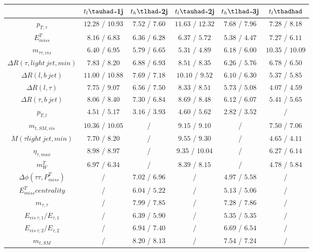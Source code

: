\centering
\begin{tabular}{cccccc} \toprule\toprule
 & $t_{l}\tauhad$-1j & $t_{h}\tlhad$-2j & $t_{l}\tauhad$-2j & $t_{h}\tlhad$-3j & $t_l\thadhad$\\\midrule
$p_{T,\tau }$ & $12.28$ / $10.93$ & $7.52$ / $7.60$ & $11.63$ / $12.32$ & $7.68$ / $7.96$ & $7.28$ / $8.18$\\
$E^{T}_{miss}$ & $8.16$ / $6.83$ & $6.36$ / $6.28$ & $6.37$ / $5.72$ & $5.38$ / $4.47$ & $7.27$ / $6.11$\\
$m_{\tau \tau ,vis}$ & $6.40$ / $6.95$ & $5.79$ / $6.65$ & $5.31$ / $4.89$ & $6.18$ / $6.00$ & $10.35$ / $10.09$\\
$\Delta R(\tau ,light~jet,min)$ & $7.83$ / $8.20$ & $6.88$ / $6.93$ & $8.51$ / $8.35$ & $6.26$ / $5.76$ & $6.78$ / $6.50$\\
$\Delta R(l,b~jet)$ & $11.00$ / $10.88$ & $7.69$ / $7.18$ & $10.10$ / $9.52$ & $6.10$ / $6.30$ & $5.37$ / $5.85$\\
$\Delta R(l,\tau )$ & $7.75$ / $9.07$ & $6.56$ / $7.50$ & $8.33$ / $8.51$ & $5.73$ / $5.08$ & $4.07$ / $4.59$\\
$\Delta R(\tau ,b~jet)$ & $8.06$ / $8.40$ & $7.30$ / $6.84$ & $8.69$ / $8.48$ & $6.12$ / $6.07$ & $5.41$ / $5.65$\\
$p_{T,l}$ & $4.51$ / $5.17$ & $3.16$ / $3.93$ & $4.60$ / $5.62$ & $2.82$ / $3.52$ &  /\\
$m_{t,SM,vis}$ & $10.36$ / $10.05$ &  / & $9.15$ / $9.10$ &  / & $7.50$ / $7.06$\\
$M(\tau  light~jet,min)$ & $7.70$ / $8.20$ &  / & $9.55$ / $9.30$ &  / & $4.65$ / $4.11$\\
$\eta_{\tau ,max}$ & $8.98$ / $8.97$ &  / & $9.35$ / $10.04$ &  / & $6.27$ / $6.14$\\
$m^{T}_{W}$ & $6.97$ / $6.34$ &  / & $8.39$ / $8.15$ &  / & $4.78$ / $5.84$\\
$\Delta\phi(\tau \tau ,P^{T}_{miss})$ &  / & $7.02$ / $6.96$ &  / & $4.97$ / $5.58$ &  /\\
$E^{T}_{miss} centrality$ &  / & $6.04$ / $5.22$ &  / & $5.13$ / $5.06$ &  /\\
$m_{\tau ,\tau }$ &  / & $7.99$ / $7.85$ &  / & $7.28$ / $7.86$ &  /\\
$E_{vis~\tau ,1}/E_{\tau ,1}$ &  / & $6.39$ / $5.90$ &  / & $5.35$ / $5.35$ &  /\\
$E_{vis~\tau ,2}/E_{\tau ,2}$ &  / & $6.94$ / $7.40$ &  / & $6.69$ / $6.54$ &  /\\
$m_{t,SM}$ &  / & $8.20$ / $8.13$ &  / & $7.54$ / $7.24$ &  /\\

\end{tabular}
